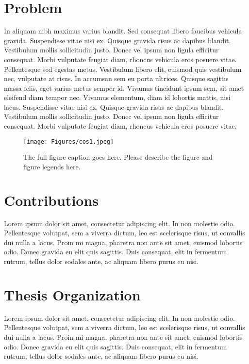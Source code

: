 \section{Problem}
In aliquam nibh maximus varius blandit. Sed consequat libero faucibus vehicula gravida. Suspendisse vitae nisi ex. Quisque gravida risus ac dapibus blandit. Vestibulum mollis sollicitudin justo. Donec vel ipsum non ligula efficitur consequat. Morbi vulputate feugiat diam, rhoncus vehicula eros posuere vitae. Pellentesque sed egestas metus. Vestibulum libero elit, euismod quis vestibulum nec, vulputate at risus. In accumsan sem eu porta ultrices. Quisque sagittis massa felis, eget varius metus semper id. Vivamus tincidunt ipsum sem, sit amet eleifend diam tempor nec. Vivamus elementum, diam id lobortis mattis, nisi lacus. Suspendisse vitae nisi ex. Quisque gravida risus ac dapibus blandit. Vestibulum mollis sollicitudin justo. Donec vel ipsum non ligula efficitur consequat. Morbi vulputate feugiat diam, rhoncus vehicula eros posuere vitae. 


\begin{figure}[tbh]
  \centering
  \texttt{[image: Figures/cos1.jpeg]}
  \caption[The short figure caption goes here.]{The full figure caption goes here. Please describe the figure and figure legends here.}
  \label{fig:cos1}
\end{figure}

\section{Contributions}
Lorem ipsum dolor sit amet, consectetur adipiscing elit. In non molestie odio. Pellentesque volutpat, sem a viverra dictum, leo est scelerisque risus, ut convallis dui nulla a lacus. Proin mi magna, pharetra non ante sit amet, euismod lobortis odio. Donec gravida eu elit quis sagittis. Duis consequat, elit in fermentum rutrum, tellus dolor sodales ante, ac aliquam libero purus eu nisi. 

\section{Thesis Organization}
Lorem ipsum dolor sit amet, consectetur adipiscing elit. In non molestie odio. Pellentesque volutpat, sem a viverra dictum, leo est scelerisque risus, ut convallis dui nulla a lacus. Proin mi magna, pharetra non ante sit amet, euismod lobortis odio. Donec gravida eu elit quis sagittis. Duis consequat, elit in fermentum rutrum, tellus dolor sodales ante, ac aliquam libero purus eu nisi. 

